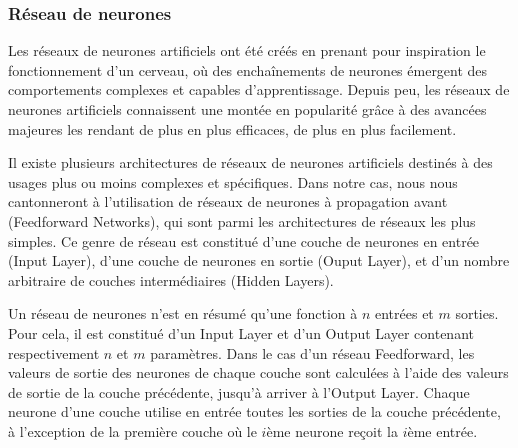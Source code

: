 \subsubsection{Réseau de neurones}
Les réseaux de neurones artificiels ont été créés en prenant pour inspiration le fonctionnement d'un cerveau, où des enchaînements de neurones émergent des comportements complexes et capables d'apprentissage.
Depuis peu, les réseaux de neurones artificiels connaissent une montée en popularité grâce à des avancées majeures les rendant de plus en plus efficaces, de plus en plus facilement.
\par
Il existe plusieurs architectures de réseaux de neurones artificiels destinés à des usages plus ou moins complexes et spécifiques. Dans notre cas, nous nous cantonneront à l'utilisation de réseaux de neurones à propagation avant (Feedforward Networks), qui sont parmi les architectures de réseaux les plus simples. Ce genre de réseau est constitué d'une couche de neurones en entrée (Input Layer), d'une couche de neurones en sortie (Ouput Layer), et d'un nombre arbitraire de couches intermédiaires (Hidden Layers).
\par
Un réseau de neurones n'est en résumé qu'une fonction à $n$ entrées et $m$ sorties. Pour cela, il est constitué d'un Input Layer et d'un Output Layer contenant respectivement $n$ et $m$ paramètres. Dans le cas d'un réseau Feedforward, les valeurs de sortie des neurones de chaque couche sont calculées à l'aide des valeurs de sortie de la couche précédente, jusqu'à arriver à l'Output Layer. Chaque neurone d'une couche utilise en entrée toutes les sorties de la couche précédente, à l'exception de la première couche où le $i$ème neurone reçoit la $i$ème entrée.
\par


